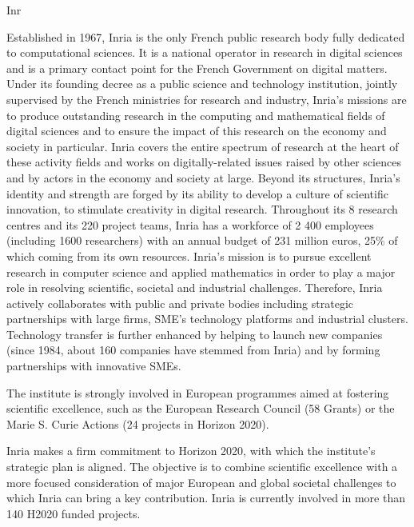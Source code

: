 \begin{sitedescription}{Inr}



Established in 1967, Inria is the only French public research body fully dedicated to computational sciences. It is a national operator in research in digital sciences and is a primary contact point for the French Government on digital matters. Under its founding decree as a public science and technology institution, jointly supervised by the French ministries for research and industry, Inria's missions are to produce outstanding research in the computing and mathematical fields of digital sciences and to ensure the impact of this research on the economy and society in particular. Inria covers the entire spectrum of research at the heart of these activity fields and works on digitally-related issues raised by other sciences and by actors in the economy and society at large. Beyond its structures, Inria's identity and strength are forged by its ability to develop a culture of scientific innovation, to stimulate creativity in digital research.
Throughout its 8 research centres and its 220 project teams, Inria has a workforce of 2 400 employees (including 1600 researchers) with an annual budget of 231 million euros, 25\% of which coming from its own resources.
Inria’s mission is to pursue excellent research in computer science and applied mathematics in order to play a major role in resolving scientific, societal and industrial challenges. Therefore, Inria actively collaborates with public and private bodies including strategic partnerships with large firms, SME’s technology platforms and industrial clusters. Technology transfer is further enhanced by helping to launch new companies (since 1984, about 160 companies have stemmed from Inria) and by forming partnerships with innovative SMEs.

The institute is strongly involved in European programmes aimed at fostering scientific excellence, such as the European Research Council (58 Grants) or the Marie S. Curie Actions (24 projects in Horizon 2020).

Inria makes a firm commitment to Horizon 2020, with which the institute’s strategic plan is aligned. The objective is to combine scientific excellence with a more focused consideration of major European and global societal challenges to which Inria can bring a key contribution. Inria is currently involved in more than 140 H2020 funded projects.


\end{sitedescription}
